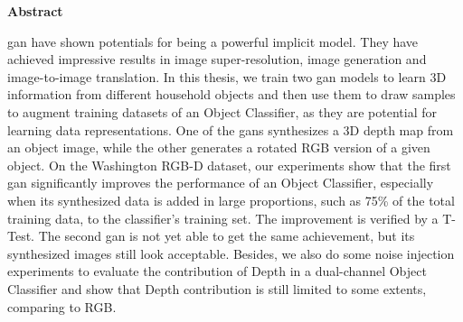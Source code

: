 \thispagestyle{empty}
\vspace*{1.0cm}

\begin{center}
    \textbf{Abstract}
\end{center}

\vspace*{0.5cm}

\noindent

\acrfull{gan} have shown potentials for being a powerful implicit model. They have
achieved impressive results in image super-resolution, image generation and image-to-image
translation. In this thesis, we train two \acrshort{gan} models to learn 3D information
from different household objects and then use them to draw samples to augment training
datasets of an Object Classifier, as they are potential for learning data representations.
One of the \acrshort{gan}s synthesizes a 3D depth map from an object image, while the
other generates a rotated RGB version of a given object. On the Washington RGB-D dataset,
our experiments show that the first \acrshort{gan} significantly improves the performance
of an Object Classifier, especially when its synthesized data is added in large
proportions, such as 75\% of the total training data, to the classifier's training set.
The improvement is verified by a T-Test. The second \acrshort{gan} is not yet able to get
the same achievement, but its synthesized images still look acceptable. Besides, we also
do some noise injection experiments to evaluate the contribution of Depth in a
dual-channel Object Classifier and show that Depth contribution is still limited to some
extents, comparing to RGB.
\\
